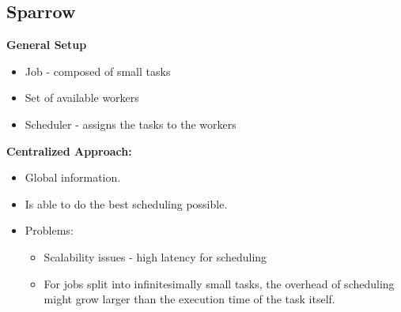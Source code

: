 \documentclass[parskip=half]{scrartcl}
\begin{document}
    \subsection{Sparrow} %
    \label{sub:sparrow}
        
        \textbf{General Setup}
        \begin{itemize}
            \item 
            Job - composed of small tasks
            \item 
            Set of available workers
            \item 
            Scheduler - assigns the tasks to the workers
        \end{itemize}

        \textbf{Centralized Approach:}\\
        \begin{itemize}
            \item 
            Global information.
            \item 
            Is able to do the best scheduling possible.
            \item 
            Problems:
            \begin{itemize}
                \item 
                Scalability issues - high latency for scheduling
                \item 
                For jobs split into infinitesimally small tasks, the overhead of scheduling might grow larger than the execution time of the task itself.
            \end{itemize}
        \end{itemize}
\end{document}
